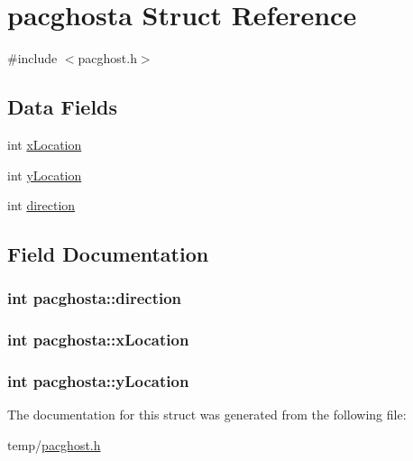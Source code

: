 \hypertarget{structpacghosta}{\section{pacghosta Struct Reference}
\label{structpacghosta}
}


{\ttfamily \#include $<$pacghost.\-h$>$}

\subsection*{Data Fields}
\begin{DoxyCompactItemize}
\item 
int \hyperlink{structpacghosta_ac12ad2644810744f2e6db574e1cff411}{x\-Location}
\item 
int \hyperlink{structpacghosta_aff515aad8edcbc14324bc16cbb447221}{y\-Location}
\item 
int \hyperlink{structpacghosta_a2c9a8abcaf505779e7ebbea1860758ef}{direction}
\end{DoxyCompactItemize}


\subsection{Field Documentation}
\hypertarget{structpacghosta_a2c9a8abcaf505779e7ebbea1860758ef}{
\subsubsection[{direction}]{\setlength{\rightskip}{0pt plus 5cm}int pacghosta\-::direction}}\label{structpacghosta_a2c9a8abcaf505779e7ebbea1860758ef}
\hypertarget{structpacghosta_ac12ad2644810744f2e6db574e1cff411}{
\subsubsection[{x\-Location}]{\setlength{\rightskip}{0pt plus 5cm}int pacghosta\-::x\-Location}}\label{structpacghosta_ac12ad2644810744f2e6db574e1cff411}
\hypertarget{structpacghosta_aff515aad8edcbc14324bc16cbb447221}{
\subsubsection[{y\-Location}]{\setlength{\rightskip}{0pt plus 5cm}int pacghosta\-::y\-Location}}\label{structpacghosta_aff515aad8edcbc14324bc16cbb447221}


The documentation for this struct was generated from the following file\-:\begin{DoxyCompactItemize}
\item 
temp/\hyperlink{temp_2pacghost_8h}{pacghost.\-h}\end{DoxyCompactItemize}
